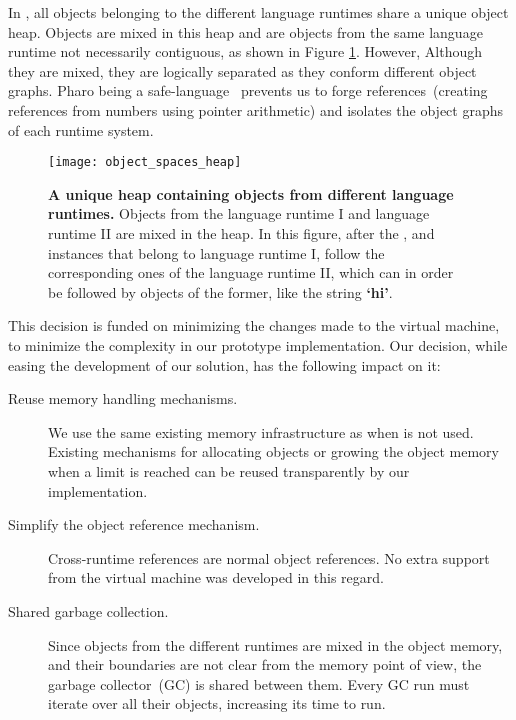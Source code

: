 In \Vtt, all objects belonging to the different language runtimes share a unique object heap. Objects are mixed in this heap and are objects from the same language runtime not necessarily contiguous, as shown in Figure \ref{fig:heap}. However, Although they are mixed, they are logically separated as they conform different object graphs. Pharo being a safe-language~\cite{Hawb98a,Hawb02a} prevents us to forge references~(\ie creating references from numbers using pointer arithmetic) and isolates the object graphs of each runtime system.

\begin{figure}[ht]
\begin{center}
\texttt{[image: object\_spaces\_heap]}
\caption{\textbf{A unique heap containing objects from different language runtimes.} Objects from the language runtime I and language runtime II are mixed in the heap. In this figure, after the ,  and  instances that belong to language runtime I, follow the corresponding ones of the language runtime II, which can in order be followed by objects of the former, like the string \textbf{`hi'}. \label{fig:heap}}
\end{center}
\end{figure}

This decision is funded on minimizing the changes made to the virtual machine, to minimize the complexity in our prototype implementation. Our decision, while easing the development of our solution, has the following impact on it:

\begin{description}
	\item[Reuse memory handling mechanisms.] We use the same existing memory infrastructure as when \Vtt is not used. Existing mechanisms for allocating objects or growing the object memory when a limit is reached can be reused transparently by our implementation. 
	\item[Simplify the object reference mechanism.] Cross-runtime references are normal object references. No extra support from the virtual machine was developed in this regard.
	\item[Shared garbage collection.] Since objects from the different runtimes are mixed in the object memory, and their boundaries are not clear from the memory point of view, the garbage collector~(GC) is shared between them. Every GC run must iterate over all their objects, increasing its time to run.
\end{description}

